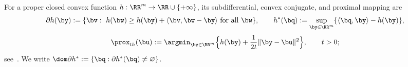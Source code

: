 For a proper closed convex function \(h:\RR^m\to\RR\cup\{+\infty\}\), its
subdifferential, convex conjugate, and proximal mapping are
\[
    \partial h(\by):=\{\bv:\ h(\bw)\ge h(\by)+\langle\bv,\bw-\by\rangle
    \ \text{for all }\bw\},
    \qquad
    h^*(\bq):=\sup_{\by\in\RR^m}\{\langle\bq,\by\rangle-h(\by)\},
\]
\begin{equation}
    \prox_{t h}(\bu)
    :=\argmin_{\by\in\RR^m}
       \Bigl\{h(\by)+\frac{1}{2t}\|\by-\bu\|^2\Bigr\},
    \qquad t>0;
    \label{eq:prox-definition}
\end{equation}
see~\cite{rockafellar1970convex}. We write
\(\dom\partial h^*:=\{\bq:\partial h^*(\bq)\neq\varnothing\}\).
